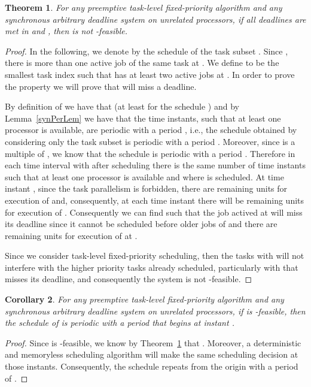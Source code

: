 \documentclass[a4paper,11pt]{article}
\newtheorem{Theorem}{Theorem}
\newtheorem{Corollary}[Theorem]{Corollary}
\begin{document}
\begin{Theorem} \label{synPerNotFeb}
For any preemptive task-level fixed-priority algorithm  and any synchronous
arbitrary deadline system  on  unrelated processors, if all deadlines are met in  and , then  is not -feasible.
\end{Theorem}

\begin{proof} 
In the following, we denote by  the schedule of the task subset . Since , there is more than one active job of the same task at . We define  to be the smallest task index such that  has at least two active jobs at . In order to prove the property we will prove that  will miss a deadline.

By definition of  we have that  (at least for the schedule ) and
by Lemma~\ref{synPerLem} we have that the time instants, such that at
least one processor is available, are periodic with a period
, i.e., the schedule  obtained by
considering only the task subset  is periodic with
a period . Moreover, since  is a multiple of
, we know that the schedule  is periodic with
a period . Therefore in each time interval  with  after scheduling  there is the same number  of
time instants such that at least one processor is available and where
 is scheduled. At time instant , since the task
parallelism is forbidden, there are 
remaining units for execution of  and, consequently,
at each time instant  there will be  remaining units for
execution of . Consequently we can find  such that the job actived at  will miss its deadline
since it cannot be scheduled before older jobs of  and
there are  remaining units for execution of  at
.

Since we consider task-level fixed-priority scheduling, then the
tasks  with  will not interfere with the higher
priority tasks already scheduled, particularly with 
that misses its deadline, and consequently the system is not
-feasible.
\end{proof}

\begin{Corollary}\label{synPerArbi}
For any preemptive task-level fixed-priority algorithm  and any synchronous
arbitrary deadline system  on  unrelated processors, if  is -feasible, then the schedule of  is periodic with a period  that begins at instant .
\end{Corollary}

\begin{proof}
Since  is -feasible, we know by Theorem~\ref{synPerNotFeb} that . Moreover, a deterministic and memoryless scheduling algorithm will make the same scheduling decision at those instants. Consequently, the schedule repeats from the origin with a period of .
\end{proof}
\end{document}

